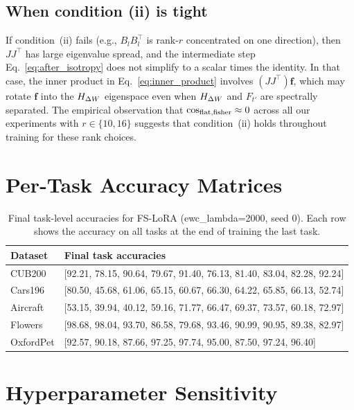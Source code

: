 \subsection*{When condition (ii) is tight}

If condition~(ii) fails (e.g., $B_lB_l^\top$ is rank-$r$ concentrated on one direction),
then $JJ^\top$ has large eigenvalue spread,
and the intermediate step Eq.~\eqref{eq:after_isotropy} does not simplify to
a scalar times the identity.
In that case, the inner product in Eq.~\eqref{eq:inner_product} involves
$(JJ^\top)\mathbf{f}$, which may rotate $\mathbf{f}$ into the $H_{\Delta W}$ eigenspace
even when $H_{\Delta W}$ and $F_{t'}$ are spectrally separated.
The empirical observation that $\cos_{\mathrm{flat,fisher}}\approx 0$ across all our experiments with $r\in\{10,16\}$
suggests that condition~(ii) holds throughout training for these rank choices.

\section{Per-Task Accuracy Matrices}
\label{sec:per_task}

\begin{table}[h]
\caption{Final task-level accuracies for FS-LoRA (ewc\_lambda=2000, seed 0).
Each row shows the accuracy on all tasks at the end of training the last task.}
\label{tab:per_task}
\centering
\begin{tabular}{lp{10cm}}
\toprule
Dataset & Final task accuracies \\
\midrule
CUB200    & [92.21, 78.15, 90.64, 79.67, 91.40, 76.13, 81.40, 83.04, 82.28, 92.24] \\
Cars196   & [80.50, 45.68, 61.06, 65.15, 60.67, 66.30, 64.22, 65.85, 66.13, 52.74] \\
Aircraft  & [53.15, 39.94, 40.12, 59.16, 71.77, 66.47, 69.37, 73.57, 60.18, 72.97] \\
Flowers   & [98.68, 98.04, 93.70, 86.58, 79.68, 93.46, 90.99, 90.95, 89.38, 82.97] \\
OxfordPet & [92.57, 90.18, 87.66, 97.25, 97.74, 95.00, 87.50, 97.24, 96.40] \\
\bottomrule
\end{tabular}
\end{table}

\section{Hyperparameter Sensitivity}
\label{sec:hparam}

